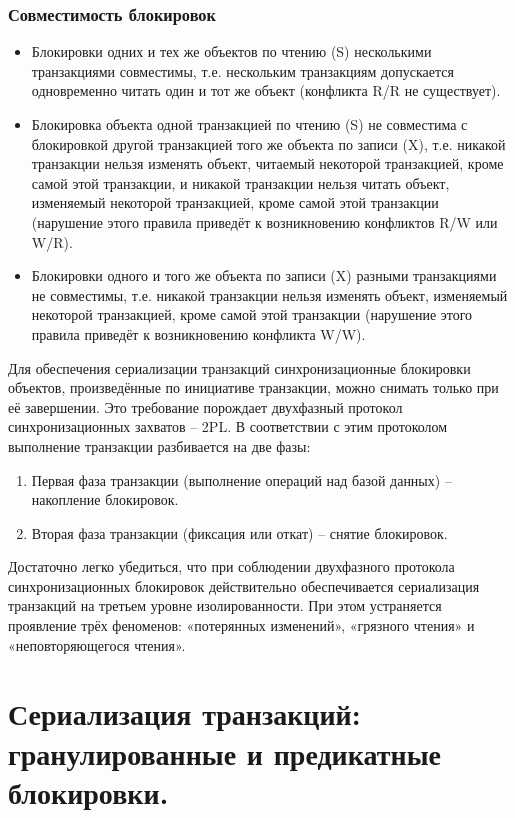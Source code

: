 \documentclass[a4paper,12pt]{article}
\begin{document}
\subsubsection{Совместимость блокировок}

\begin{itemize}
    \item Блокировки одних и тех же объектов по чтению (S) несколькими транзакциями совместимы, т.е. нескольким транзакциям допускается одновременно читать один и тот же объект (конфликта R/R не существует).
    \item Блокировка объекта одной транзакцией по чтению (S) не совместима с блокировкой другой транзакцией того же объекта по записи (X), т.е. никакой транзакции нельзя изменять объект, читаемый некоторой транзакцией, кроме самой этой транзакции, и никакой транзакции нельзя читать объект, изменяемый некоторой транзакцией, кроме самой этой транзакции (нарушение этого правила приведёт к возникновению конфликтов R/W или W/R).
    \item Блокировки одного и того же объекта по записи (X) разными транзакциями не совместимы, т.е. никакой транзакции нельзя изменять объект, изменяемый некоторой транзакцией, кроме самой этой транзакции (нарушение этого правила приведёт к возникновению конфликта W/W).
\end{itemize}

Для обеспечения сериализации транзакций синхронизационные блокировки объектов, произведённые по инициативе транзакции, можно снимать только при её завершении. Это требование порождает двухфазный протокол синхронизационных захватов – 2PL. В соответствии с этим протоколом выполнение транзакции разбивается на две фазы:
\begin{enumerate}
    \item Первая фаза транзакции (выполнение операций над базой данных) – накопление блокировок.
    \item Вторая фаза транзакции (фиксация или откат) – снятие блокировок.
\end{enumerate}

Достаточно легко убедиться, что при соблюдении двухфазного протокола синхронизационных блокировок действительно обеспечивается сериализация транзакций на третьем уровне изолированности. При этом устраняется проявление трёх феноменов: «потерянных изменений», «грязного чтения» и «неповторяющегося чтения».




\section{Сериализация транзакций: гранулированные и предикатные блокировки.}
\end{document}
